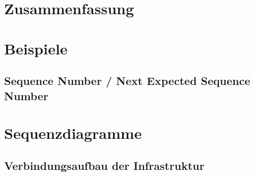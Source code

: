 \documentclass[doktyp=barbeit]{TUBAFarbeiten}
\begin{document}
\newpage
\section{Zusammenfassung}
	

\newpage
\printbibliography[heading=bibintoc]

\newpage
\appendix

\section{Beispiele}
	\subsection{Sequence Number / Next Expected Sequence Number}
		\label{sec: anhang nesn sn}
		

\section{Sequenzdiagramme}
	\subsection{Verbindungsaufbau der Infrastruktur}
		\label{sec: anhang infra verb aufbau}
		
\end{document}
